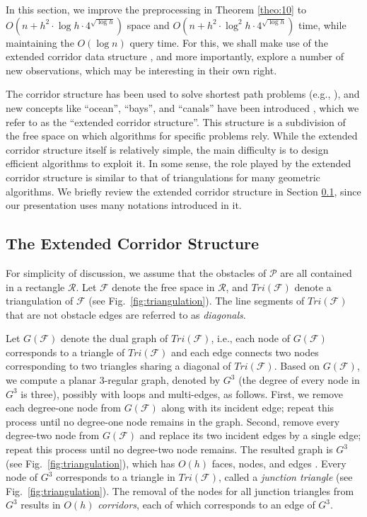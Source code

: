\documentclass[english,runningheads,11pt]{llncs}
\def\calP{\mathcal{P}}
\def\calR{\mathcal{R}}
\def\calF{\mathcal{F}}
\newcommand{\Tri}{\mbox{$T\!r\!i$}}
\begin{document}
In this section, we improve the preprocessing
 in Theorem \ref{theo:10} to $O(n+h^2\cdot \log h \cdot
4^{\sqrt{\log h}})$ space and $O(n+h^2\cdot \log^2 h \cdot 4^{\sqrt{\log h}})$ time,
while maintaining the $O(\log n)$ query time. For this, we shall make use
of the extended corridor data structure
\cite{ref:ChenA11ESA,ref:ChenCo12arXiv,ref:ChenL113STACS,ref:KapoorAn97}, and more importantly, explore
a number of new observations, which may be interesting in their own right.

The corridor structure has been used to solve shortest path problems (e.g., \cite{ref:InkuluPl09,ref:KapoorEf88,ref:KapoorAn97}), and new concepts like ``ocean'', ``bays'', and ``canals'' have been introduced \cite{ref:ChenA11ESA,ref:ChenCo12arXiv,ref:ChenCo12ICALP,ref:ChenCo13SoCG,ref:ChenL113STACS,ref:ChenVi13WADS}, which we refer to as the ``extended corridor structure''.
This structure is a subdivision of the free space on which algorithms for specific problems
rely.  While the extended corridor structure itself is relatively simple, the main difficulty is to design
efficient algorithms to exploit it. In some sense, the role played by the extended corridor structure is similar to that of triangulations for many geometric algorithms.
We briefly review the extended corridor structure in Section \ref{subsec:extended}, since our
presentation uses many notations introduced in it.

\subsection{The Extended Corridor Structure}
\label{subsec:extended}

For simplicity of discussion, we assume that the obstacles of $\calP$ are all contained in a
rectangle $\calR$.
Let $\calF$ denote the free space in $\calR$, and
$\Tri(\calF)$ denote a triangulation of $\calF$ (see Fig.~\ref{fig:triangulation}). The line segments of $\Tri(\calF)$ that are not obstacle edges are referred to as {\em diagonals}.



Let $G(\calF)$ denote the dual graph of $\Tri(\calF)$,
i.e., each node of $G(\calF)$ corresponds to a
triangle of $\Tri(\calF)$ and each edge connects two nodes
corresponding to two triangles sharing a diagonal of $\Tri(\calF)$.
Based on $G(\calF)$, we
compute a planar 3-regular graph, denoted by $G^3$ (the degree of every node in $G^3$ is three),
possibly with loops and multi-edges,
as follows. First, we remove each degree-one node from $G(\calF)$
along with its incident edge; repeat this process until no
degree-one node remains in the graph. Second, remove every degree-two node from
$G(\calF)$ and replace its two incident edges by a single edge;
repeat this process until no degree-two node remains. The
resulted graph is $G^3$ (see Fig.~\ref{fig:triangulation}), which has
$O(h)$ faces, nodes, and  edges \cite{ref:KapoorAn97}. Every node of
$G^3$ corresponds to a triangle in $\Tri(\calF)$, called a
{\em junction triangle} (see Fig.~\ref{fig:triangulation}).
The removal of the nodes for all junction triangles from $G^3$ results in $O(h)$
{\em corridors}, each of which corresponds to an edge of $G^3$.
\end{document}
